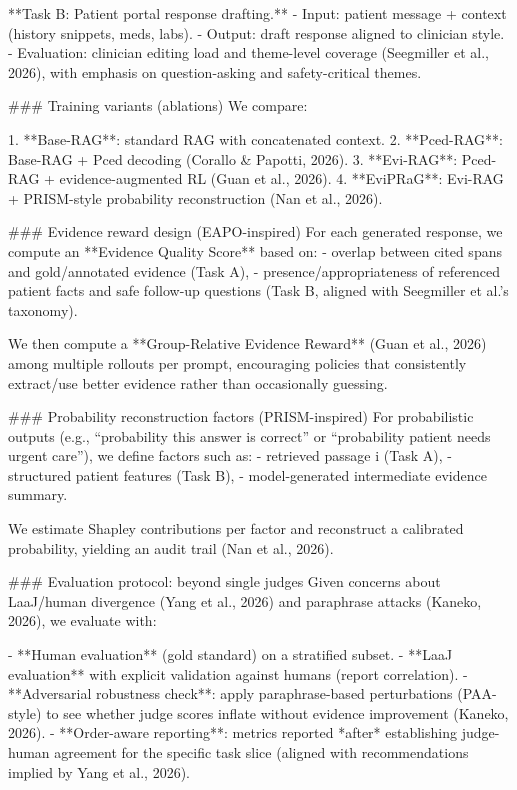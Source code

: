 **Task B: Patient portal response drafting.**  
- Input: patient message + context (history snippets, meds, labs).  
- Output: draft response aligned to clinician style.  
- Evaluation: clinician editing load and theme-level coverage (Seegmiller et al., 2026), with emphasis on question-asking and safety-critical themes.

### Training variants (ablations)  
We compare:

1. **Base-RAG**: standard RAG with concatenated context.  
2. **Pced-RAG**: Base-RAG + Pced decoding (Corallo & Papotti, 2026).  
3. **Evi-RAG**: Pced-RAG + evidence-augmented RL (Guan et al., 2026).  
4. **EviPRaG**: Evi-RAG + PRISM-style probability reconstruction (Nan et al., 2026).  

### Evidence reward design (EAPO-inspired)  
For each generated response, we compute an **Evidence Quality Score** based on:
- overlap between cited spans and gold/annotated evidence (Task A),  
- presence/appropriateness of referenced patient facts and safe follow-up questions (Task B, aligned with Seegmiller et al.’s taxonomy).  

We then compute a **Group-Relative Evidence Reward** (Guan et al., 2026) among multiple rollouts per prompt, encouraging policies that consistently extract/use better evidence rather than occasionally guessing.

### Probability reconstruction factors (PRISM-inspired)  
For probabilistic outputs (e.g., “probability this answer is correct” or “probability patient needs urgent care”), we define factors such as:
- retrieved passage i (Task A),  
- structured patient features (Task B),  
- model-generated intermediate evidence summary.

We estimate Shapley contributions per factor and reconstruct a calibrated probability, yielding an audit trail (Nan et al., 2026).

### Evaluation protocol: beyond single judges  
Given concerns about LaaJ/human divergence (Yang et al., 2026) and paraphrase attacks (Kaneko, 2026), we evaluate with:

- **Human evaluation** (gold standard) on a stratified subset.  
- **LaaJ evaluation** with explicit validation against humans (report correlation).  
- **Adversarial robustness check**: apply paraphrase-based perturbations (PAA-style) to see whether judge scores inflate without evidence improvement (Kaneko, 2026).  
- **Order-aware reporting**: metrics reported *after* establishing judge-human agreement for the specific task slice (aligned with recommendations implied by Yang et al., 2026).

